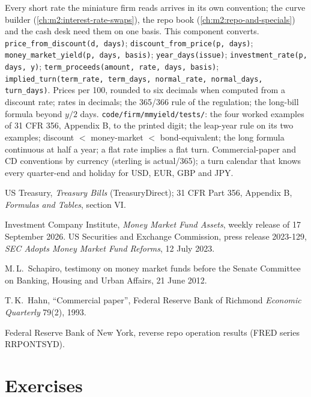 \begin{build}
 Every short rate the miniature firm reads arrives in its
own convention; the curve builder (\cref{ch:m2:interest-rate-swaps}), the repo
book (\cref{ch:m2:repo-and-specials}) and the cash desk need them on one
basis. This component converts.
 \texttt{price\_from\_discount(d, days)};
\texttt{discount\_from\_price(p, days)};
\texttt{money\_market\_yield(p, days, basis)}; \texttt{year\_days(issue)};
\texttt{investment\_rate(p, days, y)}; \texttt{term\_proceeds(amount, rate,
days, basis)}; \texttt{implied\_turn(term\_rate, term\_days, normal\_rate,
normal\_days, turn\_days)}.
 Prices per 100, rounded to six decimals when computed from a
discount rate; rates in decimals; the 365/366 rule of the regulation; the
long-bill formula beyond $y/2$ days.
 \texttt{code/firm/mmyield/tests/}: the four worked
examples of 31 CFR 356, Appendix B, to the printed digit; the leap-year rule
on its two examples; discount $<$ money-market $<$ bond-equivalent; the long
formula continuous at half a year; a flat rate implies a flat turn.
 Commercial-paper and CD conventions by currency (sterling
is actual/365); a turn calendar that knows every quarter-end and holiday for
USD, EUR, GBP and JPY.
\end{build}

\begin{omsources}
\item US Treasury, \emph{Treasury Bills} (TreasuryDirect); 31 CFR Part 356,
Appendix B, \emph{Formulas and Tables}, section VI.
\item Investment Company Institute, \emph{Money Market Fund Assets}, weekly
release of 17 September 2026. US Securities and Exchange Commission, press
release 2023-129, \emph{SEC Adopts Money Market Fund Reforms}, 12 July 2023.
\item M.\,L.\ Schapiro, testimony on money market funds before the Senate
Committee on Banking, Housing and Urban Affairs, 21 June 2012.
\item T.\,K.\ Hahn, ``Commercial paper'', Federal Reserve Bank of Richmond
\emph{Economic Quarterly} 79(2), 1993.
\item Federal Reserve Bank of New York, reverse repo operation results
(FRED series RRPONTSYD).
\end{omsources}

\section{Exercises}

